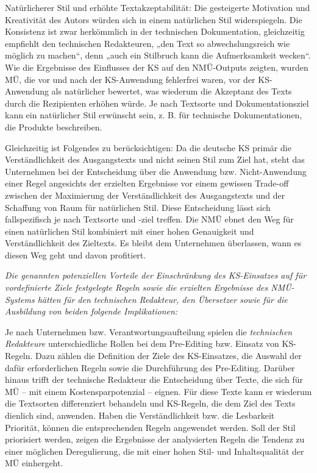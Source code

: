 Natürlicherer Stil und erhöhte Textakzeptabilität: Die gesteigerte Motivation und Kreativität des Autors würden sich in einem natürlichen Stil widerspiegeln. Die Konsistenz ist zwar herkömmlich in der technischen Dokumentation, gleichzeitig empfiehlt \citet[335f.]{Püschel1996} den technischen Redakteuren, „den Text so abwechslungsreich wie möglich zu machen“, denn „auch ein Stilbruch kann die Aufmerksamkeit wecken“. Wie die Ergebnisse des Einflusses der KS auf den NMÜ-Outputs zeigten, wurden MÜ, die vor und nach der KS-Anwendung fehlerfrei waren, vor der KS-Anwendung als natürlicher bewertet, was wiederum die Akzeptanz des Texts durch die Rezipienten erhöhen würde. Je nach Textsorte und Dokumentationsziel kann ein natürlicher Stil erwünscht sein, z. B. für technische Dokumentationen, die Produkte beschreiben.

Gleichzeitig ist Folgendes zu berücksichtigen: Da die deutsche KS primär die Verständlichkeit des Ausgangstexts und nicht seinen Stil zum Ziel hat, steht das Unternehmen bei der Entscheidung über die Anwendung bzw. Nicht-Anwen\-dung einer Regel angesichts der erzielten Ergebnisse vor einem gewissen Trade-off zwischen der Maximierung der Verständlichkeit des Ausgangstexts und der Schaffung von Raum für natürlichen Stil. Diese Entscheidung lässt sich fallspezifisch je nach Textsorte und -ziel treffen. Die NMÜ ebnet den Weg für einen natürlichen Stil kombiniert mit einer hohen Genauigkeit und Verständlichkeit des Zieltexts. Es bleibt dem Unternehmen überlassen, wann es diesen Weg geht und davon profitiert.

\textit{Die genannten potenziellen Vorteile der Einschränkung des KS-Einsatzes auf für vordefinierte Ziele festgelegte Regeln sowie die erzielten Ergebnisse des NMÜ-Systems hätten für den technischen Redakteur, den Übersetzer sowie für die Ausbildung von beiden folgende Implikationen:}

Je nach Unternehmen bzw. Verantwortungsaufteilung spielen die \textit{technischen Redakteure} unterschiedliche Rollen bei dem Pre-Editing bzw. Einsatz von KS-Regeln. Dazu zählen die Definition der Ziele des KS-Einsatzes, die Auswahl der dafür erforderlichen Regeln sowie die Durchführung des Pre-Editing. Darüber hinaus trifft der technische Redakteur die Entscheidung über Texte, die sich für MÜ -- mit einem Kostensparpotenzial -- eignen. Für diese Texte kann er wiederum die Textsorten differenziert behandeln und KS-Regeln, die dem Ziel des Texts dienlich sind, anwenden. Haben die Verständlichkeit bzw. die Lesbarkeit Priorität, können die entsprechenden Regeln angewendet werden. Soll der Stil priorisiert werden, zeigen die Ergebnisse der analysierten Regeln die Tendenz zu einer möglichen Deregulierung, die mit einer hohen Stil- und Inhaltsqualität der MÜ einhergeht.

